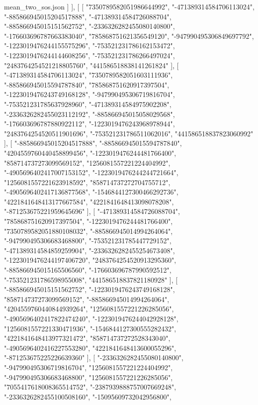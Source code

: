 \begin{filecontents*}[overwrite]{mean_two_sos.json}
   ]
  ],
  [
   [
    "7350789582051986644992",
    "-471389314584706113024",
    "-885866945015204517888",
    "-471389314584726088704",
    "-885866945015151562752",
    "-2336326282455080140800",
    "-176603696787663383040",
    "785868751621356549120",
    "-947990495306849697792",
    "-1223019476244155575296",
    "-753521231786162153472",
    "-1223019476244144608256",
    "-753521231786266497024",
    "2483764254521218805760",
    "441586518838141261824"
   ],
   [
    "-471389314584706113024",
    "7350789582051603111936",
    "-885866945015594787840",
    "785868751620917397504",
    "-1223019476243749168128",
    "-947990495306719816704",
    "-753521231785637928960",
    "-471389314584975902208",
    "-2336326282455023112192",
    "-885866945015058029568",
    "-176603696787880922112",
    "-1223019476243968978944",
    "2483764254520511901696",
    "-753521231786511062016",
    "441586518837823060992"
   ],
   [
    "-885866945015204517888",
    "-885866945015594787840",
    "4204559760440458899456",
    "-1223019476244481766400",
    "858714737273099569152",
    "1256081557221224404992",
    "-4905696402417007153152",
    "-1223019476244244721664",
    "1256081557221623918592",
    "858714737272704755712",
    "-4905696402417136877568",
    "-1546844127300466292736",
    "4221841648413177667584",
    "4221841648413098078208",
    "-871253675221959645696"
   ],
   [
    "-471389314584726088704",
    "785868751620917397504",
    "-1223019476244481766400",
    "7350789582051880108032",
    "-885866945014994264064",
    "-947990495306683468800",
    "-753521231785447729152",
    "-471389314584859259904",
    "-2336326282455254673408",
    "-1223019476244197406720",
    "2483764254520913295360",
    "-885866945015165506560",
    "-176603696787990592512",
    "-753521231786598955008",
    "441586518837821180928"
   ],
   [
    "-885866945015151562752",
    "-1223019476243749168128",
    "858714737273099569152",
    "-885866945014994264064",
    "4204559760440844939264",
    "1256081557221226285056",
    "-4905696402417822474240",
    "-1223019476244042928128",
    "1256081557221330471936",
    "-1546844127300555282432",
    "4221841648413977321472",
    "858714737272528343040",
    "-4905696402416227553280",
    "4221841648413600055296",
    "-871253675225226639360"
   ],
   [
    "-2336326282455080140800",
    "-947990495306719816704",
    "1256081557221224404992",
    "-947990495306683468800",
    "1256081557221226285056",
    "7055417618008365514752",
    "-2387939888757007669248",
    "-2336326282455100508160",
    "-15095609732042956800",

\end{filecontents*}
